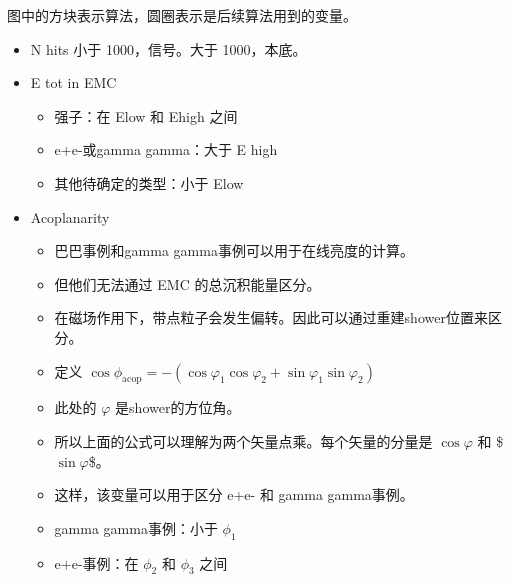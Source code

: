 \documentclass[11pt]{article}
\begin{document}
图中的方块表示算法，圆圈表示是后续算法用到的变量。

\begin{itemize}
\item N hits 小于 1000，信号。大于 1000，本底。
\item E tot in EMC
\begin{itemize}
\item 强子：在 Elow 和 Ehigh 之间
\item e+e-或gamma gamma：大于 E high
\item 其他待确定的类型：小于 Elow
\end{itemize}
\item Acoplanarity
\begin{itemize}
\item 巴巴事例和gamma gamma事例可以用于在线亮度的计算。
\item 但他们无法通过 EMC 的总沉积能量区分。
\item 在磁场作用下，带点粒子会发生偏转。因此可以通过重建shower位置来区分。
\item 定义 \(\cos\phi_{\mathrm{acop}} = -(\cos\varphi_1 \cos\varphi_2 + \sin\varphi_1 \sin\varphi_2)\)
\item 此处的 \(\varphi\) 是shower的方位角。
\item 所以上面的公式可以理解为两个矢量点乘。每个矢量的分量是 \(\cos\varphi\) 和 \$\(\sin \varphi\)\$。
\item 这样，该变量可以用于区分 e+e- 和 gamma gamma事例。
\item gamma gamma事例：小于 \(\phi_1\)
\item e+e-事例：在 \(\phi_2\) 和 \(\phi_3\) 之间
\end{itemize}
\end{itemize}
\end{document}
